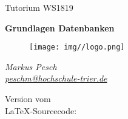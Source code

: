 \begin{titlepage}
  \begin{center}
    \begin{large}
      Tutorium WS1819
    \end{large}

    \begin{huge}
      \begin{singlespace}
        \textbf{Grundlagen Datenbanken}
      \end{singlespace}
    \end{huge}

    \vspace{0.5cm}

    \begin{figure}[h]
      \centering
      \texttt{[image: img//logo.png]}
      \label{img:fh-trier-logo}
    \end{figure}

    \vspace{2cm}
    \begin{large}
      \textit{Markus Pesch} \\
      \href{mailto:peschm@hochschule-trier.de}{\textit{peschm@hochschule-trier.de}}
    \end{large}
    \vspace{2cm}

    Version  vom  \\
    \LaTeX -Sourcecode: 

  \end{center}
\end{titlepage}

